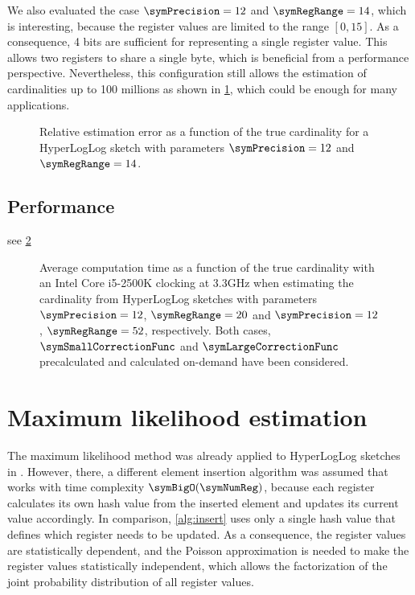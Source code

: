 \documentclass[a4paper]{scrartcl}
\begin{document}
We also evaluated the case $\symPrecision = 12$ and $\symRegRange=14$, which is interesting, because the register values are limited to the range $[0, 15]$. As a consequence, 4 bits are sufficient for representing a single register value. This allows two registers to share a single byte, which is beneficial from a performance perspective. Nevertheless, this configuration still allows the estimation of cardinalities up to 100 millions as shown in \cref{fig:raw_corrected_estimation_error_12_14}, which could be enough for many applications.

\begin{figure}
\centering

\caption{Relative estimation error as a function of the true cardinality for a HyperLogLog sketch with parameters $\symPrecision = 12$ and $\symRegRange=14$.}
\label{fig:raw_corrected_estimation_error_12_14}
\end{figure}

\subsection{Performance}
see \cref{fig:corrected_raw_avg_exec_time}

\begin{figure}
\centering

\caption{Average computation time as a function of the true cardinality with an Intel Core i5-2500K clocking at 3.3GHz when estimating the cardinality from HyperLogLog sketches with parameters $\symPrecision=12$, $\symRegRange=20$ and $\symPrecision=12$, $\symRegRange=52$, respectively. Both cases, $\symSmallCorrectionFunc$ and $\symLargeCorrectionFunc$ precalculated and calculated on-demand have been considered.}
\label{fig:corrected_raw_avg_exec_time}
\end{figure}

\section{Maximum likelihood estimation}

The maximum likelihood method was already applied to HyperLogLog sketches in \cite{Clifford2012}. However, there, a different element insertion algorithm was assumed that works with time complexity $\symBigO(\symNumReg)$, because each register calculates its own hash value from the inserted element and updates its current value accordingly. In comparison, \cref{alg:insert} uses only a single hash value that defines which register needs to be updated. As a consequence, the register values are statistically dependent, and the Poisson approximation is needed to make the register values statistically independent, which allows the factorization of the joint probability distribution of all register values.
\end{document}
